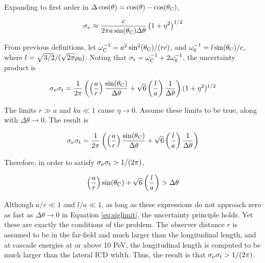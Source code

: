 \documentclass[amsmath,amssymb,aps,prd,10pt,twocolumn]{revtex4}
\begin{document}
Expanding to first order in $\Delta\cos(\theta) = \cos(\theta) - \cos(\theta_{\rm C})$,

\begin{equation}
\sigma_{\rm \nu} \approx \frac{c}{2\pi a \sin(\theta_{\rm C}) \Delta\theta}\left(1+\eta^2\right)^{1/2} \label{eq:sigmanu2}
\end{equation}

From previous definitions, let $\omega_{\rm C}^{-1} = a^2 \sin^2(\theta_{\rm C})/(rc)$, and $\omega_{\rm 0}^{-1} = l \sin(\theta_{\rm C})/c$, where $l = \sqrt{3/2}/(\sqrt{2\pi} \rho_{\rm 0})$.  Noting that $\sigma_{\rm t} = \omega_{\rm C}^{-1} + 2 \omega_{\rm 0}^{-1}$, the uncertainty product is

\begin{equation}
\sigma_{\rm \nu} \sigma_{\rm t} = \frac{1}{2\pi} \left( \left(\frac{a}{r}\right) \frac{\sin(\theta_{\rm C})}{\Delta \theta} + \sqrt{6} \left( \frac{l}{a} \right) \frac{1}{\Delta \theta} \right) (1+\eta^2)^{1/2}
\end{equation}

The limits $r \gg a$ and $ka \ll 1$ cause $\eta \to 0$.  Assume these limits to be true, along with $\Delta\theta \to 0$.  The result is

\begin{equation}
\sigma_{\rm \nu} \sigma_{\rm t} = \frac{1}{2\pi} \left( \left(\frac{a}{r}\right) \frac{\sin(\theta_{\rm C})}{\Delta \theta} + \sqrt{6} \left( \frac{l}{a} \right) \frac{1}{\Delta \theta} \right) \label{eq:sigma_oncone}
\end{equation}

Therefore, in order to satisfy $\sigma_{\rm \nu} \sigma_{\rm t} > 1/(2\pi)$,

\begin{equation}
\left(\frac{a}{r}\right)\sin(\theta_{\rm C}) + \sqrt{6} \left( \frac{l}{a} \right) > \Delta\theta \label{eq:siglimit}
\end{equation}

Although $a/r \ll 1$ and $l/a \ll 1$, as long as these expressions do not approach zero as fast as $\Delta\theta \to 0$ in Equation \ref{eq:siglimit}, the uncertainty principle holds.  Yet these are exactly the conditions of the problem.  The observer distance $r$ is assumed to be in the far-field and much larger than the longitudinal length, and at cascade energies at or above 10 PeV, the longitudinal length is computed to be much larger than the lateral ICD width.  Thus, the result is that $\sigma_{\rm \nu} \sigma_{\rm t} > 1/(2\pi)$.
\end{document}
